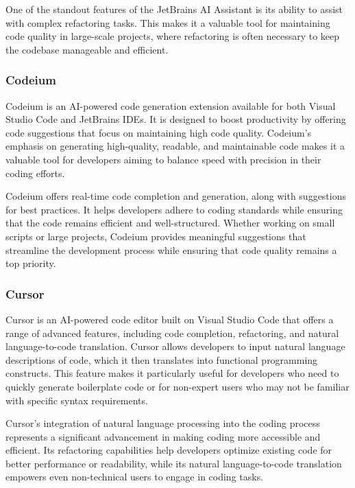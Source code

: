 One of the standout features of the JetBrains AI Assistant is its ability to assist with complex refactoring tasks. This makes it a valuable tool for maintaining code quality in large-scale projects, where refactoring is often necessary to keep the codebase manageable and efficient.

\subsubsection{Codeium}

Codeium is an AI-powered code generation extension available for both Visual Studio Code and JetBrains IDEs. It is designed to boost productivity by offering code suggestions that focus on maintaining high code quality. Codeium's emphasis on generating high-quality, readable, and maintainable code makes it a valuable tool for developers aiming to balance speed with precision in their coding efforts.

Codeium offers real-time code completion and generation, along with suggestions for best practices. It helps developers adhere to coding standards while ensuring that the code remains efficient and well-structured. Whether working on small scripts or large projects, Codeium provides meaningful suggestions that streamline the development process while ensuring that code quality remains a top priority.

\subsubsection{Cursor}

Cursor is an AI-powered code editor built on Visual Studio Code that offers a range of advanced features, including code completion, refactoring, and natural language-to-code translation. Cursor allows developers to input natural language descriptions of code, which it then translates into functional programming constructs. This feature makes it particularly useful for developers who need to quickly generate boilerplate code or for non-expert users who may not be familiar with specific syntax requirements.

Cursor's integration of natural language processing into the coding process represents a significant advancement in making coding more accessible and efficient. Its refactoring capabilities help developers optimize existing code for better performance or readability, while its natural language-to-code translation empowers even non-technical users to engage in coding tasks.

